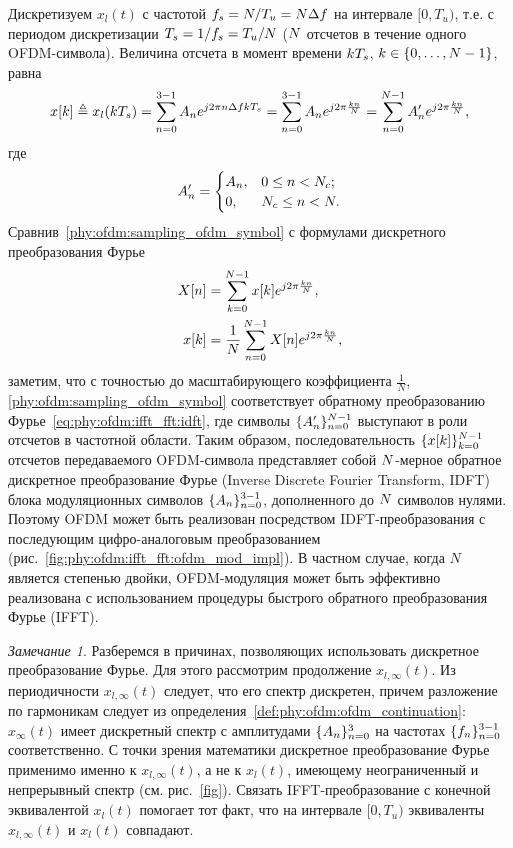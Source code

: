 \documentclass{book}
\numberwithin{theorem}{chapter}
\numberwithin{statement}{chapter}
\numberwithin{lemma}{chapter}
\theoremstyle{definition}
\numberwithin{task}{chapter}
\theoremstyle{remark}
\numberwithin{example}{chapter}
\theoremstyle{definition}
\numberwithin{definition}{chapter}
\theoremstyle{remark}
\newtheorem{note}{Замечание}
\theoremstyle{remark}
\numberwithin{lyrics}{section}
\begin{document}
Дискретизуем $x_{l}(t)$ с частотой $f_s = N / T_u = N \Delta f$ на интервале $[0, T_u)$, т.е. с периодом дискретизации $T_s = 1 / f_s = T_u/N$ ($N$ отсчетов в течение одного OFDM-символа). Величина отсчета в момент времени $k T_s$, $k \in \{0, \dots, N-1\}$, равна
\begin{equation}
\label{phy:ofdm:sampling_ofdm_symbol}
x[k] \triangleq x_{l}(k T_s) = 
\sum\limits_{n = 0}^{3 - 1} A_n e^{j2\pi n \Delta f k T_s} = 
\sum\limits_{n = 0}^{3 - 1} A_n e^{j2\pi \frac{k n}{N}} = 
\sum\limits_{n = 0}^{N - 1} A'_n e^{j2\pi \frac{k n}{N}},
\end{equation}
где 
\begin{equation}
\notag
A'_n =
\begin{cases}
A_n, &0 \le n < N_c;\\
0, &N_c\le n < N.
\end{cases}
\end{equation}
Сравнив~\eqref{phy:ofdm:sampling_ofdm_symbol} с формулами дискретного преобразования Фурье
\begin{align}
\label{eq:phy:ofdm:ifft_fft:dft}
X[n] &= \sum\limits_{k = 0}^{N-1} x[k] e^{j2\pi \frac{k n}{N}}, \\
\label{eq:phy:ofdm:ifft_fft:idft}
x[k] &= \frac{1}{N} \sum\limits_{n = 0}^{N-1} X[n] e^{j2\pi \frac{k n}{N}},
\end{align}
заметим, что с точностью до масштабирующего коэффициента $\frac{1}{N}$, \eqref{phy:ofdm:sampling_ofdm_symbol} соответствует обратному преобразованию Фурье~\eqref{eq:phy:ofdm:ifft_fft:idft}, где символы $\{A'_n\}_{n = 0}^{N - 1}$ выступают в роли отсчетов в частотной области. Таким образом, последовательность $\{x[k]\}_{k = 0}^{N - 1}$ отсчетов передаваемого OFDM-символа представляет собой $N$-мерное обратное дискретное преобразование Фурье (Inverse Discrete Fourier Transform, IDFT) блока модуляционных символов $\{A_n\}_{n = 0}^{3 - 1}$, дополненного до $N$ символов нулями. Поэтому OFDM может быть реализован посредством IDFT-преобразования с последующим цифро-аналоговым преобразованием (рис.~\ref{fig:phy:ofdm:ifft_fft:ofdm_mod_impl}). В частном случае, когда $N$ является степенью двойки, OFDM-модуляция может быть эффективно реализована с использованием процедуры быстрого обратного преобразования Фурье (IFFT).

\begin{note}
Разберемся в причинах, позволяющих использовать дискретное преобразование Фурье. Для этого рассмотрим продолжение $x_{l, \infty}(t)$. Из периодичности $x_{l, \infty}(t)$ следует, что его спектр дискретен, причем разложение по гармоникам следует из определения~\eqref{def:phy:ofdm:ofdm_continuation}: $x_{\infty}(t)$ имеет дискретный спектр с амплитудами $\{A_n\}_{n = 0}^{3}$ на частотах $\{f_n\}_{n=0}^{3-1}$ соответственно. С точки зрения математики дискретное преобразование Фурье применимо именно к $x_{l, \infty}(t)$, а не к $x_{l}(t)$, имеющему неограниченный и непрерывный спектр (см. рис.~\ref{fig}). Связать IFFT-преобразование с конечной эквивалентой $x_{l}(t)$ помогает тот факт, что на интервале $[0, T_u)$ эквиваленты $x_{l,\infty}(t)$ и $x_{l}(t)$ совпадают.
\end{note}
\end{document}
